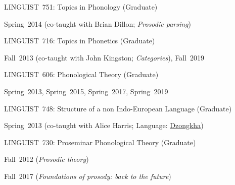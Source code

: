 \documentclass[10pt]{article}
\newcommand{\halfblankline}{\quad\vspace{-0.5\baselineskip}\pagebreak[3]}
\begin{document}
\begin{outerlist}
\begin{innerlist}
        \halfblankline

        \item LINGUIST~751:
          Topics in Phonology (Graduate)
        \begin{innerlist}[\enskip$\circ$,leftmargin=*]
            \item Spring~2014 (co-taught with Brian Dillon;
              \emph{Prosodic parsing})
        \end{innerlist}

        \halfblankline

        \item LINGUIST~716:
          Topics in Phonetics (Graduate)
        \begin{innerlist}[\enskip$\circ$,leftmargin=*]
            \item Fall~2013 (co-taught with John Kingston; \emph{Categories}), Fall~2019
        \end{innerlist}

        \halfblankline

        \item LINGUIST~606:
          Phonological Theory (Graduate)
        \begin{innerlist}[\enskip$\circ$,leftmargin=*]
            \item Spring~2013, Spring~2015, Spring~2017, Spring~2019
        \end{innerlist}

        \halfblankline

        \item LINGUIST~748:
          Structure of a non Indo-European Language (Graduate)
        \begin{innerlist}[\enskip$\circ$,leftmargin=*]
            \item Spring~2013 (co-taught with Alice Harris; Language: \href{http://www.ethnologue.com/language/dzo}{Dzongkha})
        \end{innerlist}

        \halfblankline

        \item LINGUIST~730:
          Proseminar Phonological Theory (Graduate)
        \begin{innerlist}[\enskip$\circ$,leftmargin=*]
            \item Fall~2012 (\emph{Prosodic theory})
            \item Fall~2017 (\emph{Foundations of prosody: back to the future})
        \end{innerlist}

    \end{innerlist}

\end{outerlist}
\end{document}

